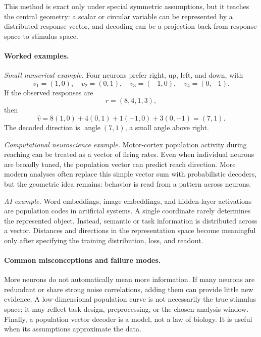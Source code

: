 This method is exact only under special symmetric assumptions, but it teaches the central geometry: a scalar or circular variable can be represented by a distributed response vector, and decoding can be a projection back from response space to stimulus space.

\paragraph{Worked examples.}
\emph{Small numerical example.}
Four neurons prefer right, up, left, and down, with
\[
v_1=(1,0),\quad v_2=(0,1),\quad v_3=(-1,0),\quad v_4=(0,-1).
\]
If the observed responses are
\[
r=(8,4,1,3),
\]
then
\[
\widehat v=8(1,0)+4(0,1)+1(-1,0)+3(0,-1)=(7,1).
\]
The decoded direction is \(\operatorname{angle}(7,1)\), a small angle above right.

\emph{Computational neuroscience example.}
Motor-cortex population activity during reaching can be treated as a vector of firing rates. Even when individual neurons are broadly tuned, the population vector can predict reach direction. More modern analyses often replace this simple vector sum with probabilistic decoders, but the geometric idea remains: behavior is read from a pattern across neurons.

\emph{AI example.}
Word embeddings, image embeddings, and hidden-layer activations are population codes in artificial systems. A single coordinate rarely determines the represented object. Instead, semantic or task information is distributed across a vector. Distances and directions in the representation space become meaningful only after specifying the training distribution, loss, and readout.

\paragraph{Common misconceptions and failure modes.}
More neurons do not automatically mean more information. If many neurons are redundant or share strong noise correlations, adding them can provide little new evidence. A low-dimensional population curve is not necessarily the true stimulus space; it may reflect task design, preprocessing, or the chosen analysis window. Finally, a population vector decoder is a model, not a law of biology. It is useful when its assumptions approximate the data.

